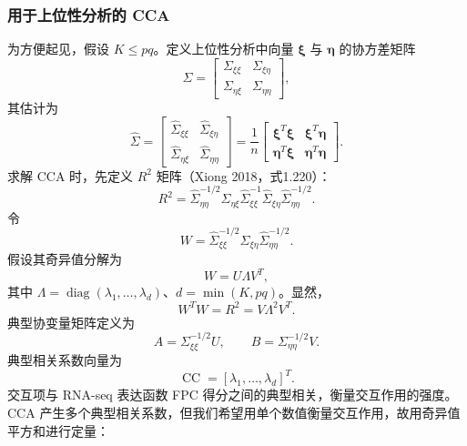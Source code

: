 \subsubsection{用于上位性分析的 CCA}
为方便起见，假设 $K\le pq$。定义上位性分析中向量 $\boldsymbol\xi$ 与 $\boldsymbol\eta$ 的协方差矩阵
\[
\Sigma=\begin{bmatrix}\Sigma_{\xi\xi}&\Sigma_{\xi\eta}\\\Sigma_{\eta\xi}&\Sigma_{\eta\eta}\end{bmatrix},
\]
其估计为
\begin{equation}
\hat\Sigma=\begin{bmatrix}\hat\Sigma_{\xi\xi}&\hat\Sigma_{\xi\eta}\\\hat\Sigma_{\eta\xi}&\hat\Sigma_{\eta\eta}\end{bmatrix}
=\frac1n\begin{bmatrix}\boldsymbol\xi^T\boldsymbol\xi&\boldsymbol\xi^T\boldsymbol\eta\\\boldsymbol\eta^T\boldsymbol\xi&\boldsymbol\eta^T\boldsymbol\eta\end{bmatrix}.
\tag{4.132}
\end{equation}
求解 CCA 时，先定义 $R^2$ 矩阵（Xiong 2018，式1.220）：
\begin{equation}
R^2=\hat\Sigma_{\eta\eta}^{-1/2}\hat\Sigma_{\eta\xi}
\hat\Sigma_{\xi\xi}^{-1}\hat\Sigma_{\xi\eta}\hat\Sigma_{\eta\eta}^{-1/2}.
\tag{4.133}
\end{equation}
令
\begin{equation}
W=\hat\Sigma_{\xi\xi}^{-1/2}\hat\Sigma_{\xi\eta}\hat\Sigma_{\eta\eta}^{-1/2}.
\tag{4.134}
\end{equation}
假设其奇异值分解为
\begin{equation}
W=U\Lambda V^T,
\tag{4.135}
\end{equation}
其中 $\Lambda=\operatorname{diag}(\lambda_1,\ldots,\lambda_d)$、$d=\min(K,pq)$。显然，
\begin{equation}
W^TW=R^2=V\Lambda^2V^T.
\tag{4.136}
\end{equation}
典型协变量矩阵定义为
\begin{equation}
A=\Sigma_{\xi\xi}^{-1/2}U,\qquad
B=\Sigma_{\eta\eta}^{-1/2}V.
\tag{4.137}
\end{equation}
典型相关系数向量为
\begin{equation}
\operatorname{CC}=[\lambda_1,\ldots,\lambda_d]^T.
\tag{4.138}
\end{equation}
交互项与 RNA-seq 表达函数 FPC 得分之间的典型相关，衡量交互作用的强度。CCA 产生多个典型相关系数，但我们希望用单个数值衡量交互作用，故用奇异值平方和进行定量：
